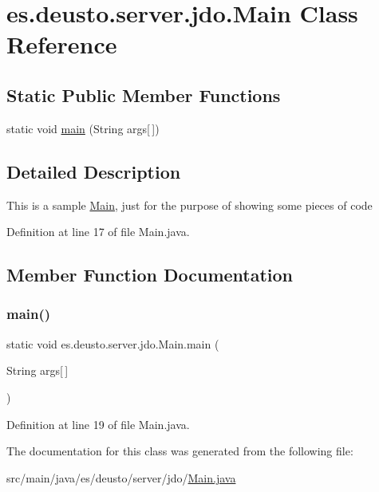 \hypertarget{classes_1_1deusto_1_1server_1_1jdo_1_1_main}{}\section{es.\+deusto.\+server.\+jdo.\+Main Class Reference}
\label{classes_1_1deusto_1_1server_1_1jdo_1_1_main}
\subsection*{Static Public Member Functions}
\begin{DoxyCompactItemize}
\item 
static void \hyperlink{classes_1_1deusto_1_1server_1_1jdo_1_1_main_ae5c4387237170481808b08438af03fd9}{main} (String args\mbox{[}$\,$\mbox{]})
\end{DoxyCompactItemize}


\subsection{Detailed Description}
This is a sample \hyperlink{classes_1_1deusto_1_1server_1_1jdo_1_1_main}{Main}, just for the purpose of showing some pieces of code 

Definition at line 17 of file Main.\+java.



\subsection{Member Function Documentation}
\mbox{\label{classes_1_1deusto_1_1server_1_1jdo_1_1_main_ae5c4387237170481808b08438af03fd9}} 
\subsubsection{\texorpdfstring{main()}{main()}}
{\footnotesize\ttfamily static void es.\+deusto.\+server.\+jdo.\+Main.\+main (\begin{DoxyParamCaption}\item[{String}]{args\mbox{[}$\,$\mbox{]} }\end{DoxyParamCaption})\hspace{0.3cm}{\ttfamily [static]}}



Definition at line 19 of file Main.\+java.



The documentation for this class was generated from the following file\+:\begin{DoxyCompactItemize}
\item 
src/main/java/es/deusto/server/jdo/\hyperlink{_main_8java}{Main.\+java}\end{DoxyCompactItemize}
